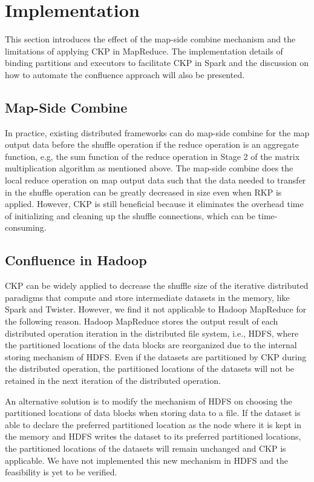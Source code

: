 \documentclass[10pt,journal,compsoc]{IEEEtran}
\begin{document}
\section{Implementation}\label{section:implement}
This section introduces the effect of the map-side combine mechanism and the
limitations of applying CKP in MapReduce.
The implementation details of binding partitions and executors to
facilitate CKP in Spark and the discussion on how to automate
the confluence approach will also be presented.

\subsection{Map-Side Combine}
In practice, existing distributed frameworks can do map-side
combine for the map output data before the shuffle operation if the
reduce operation is an aggregate function, e.g, the sum function of the
reduce operation in Stage 2 of the matrix multiplication algorithm as
mentioned above.
The map-side combine does the local reduce operation on map output data
such that the data needed to transfer in the shuffle operation can be
greatly decreased in size even when RKP is applied.
However, CKP is still beneficial because it eliminates the overhead time
of initializing and cleaning up the %
shuffle connections, which can be time-consuming.


\subsection{Confluence in Hadoop}
CKP can be widely applied to decrease the shuffle size of the iterative
distributed paradigms that compute and store intermediate datasets in
the memory, like Spark and Twister.
However, we find it not applicable to Hadoop MapReduce for the following reason. 
Hadoop MapReduce stores the output result of each distributed operation
iteration in the distributed file system, i.e., HDFS,
where the partitioned locations of the data blocks are reorganized due to the internal storing mechanism of HDFS.
Even if the datasets are partitioned by CKP during the distributed
operation, the partitioned locations of the datasets will not be
retained in the next iteration of the distributed operation.

An alternative solution is to modify the mechanism of HDFS on choosing the
partitioned locations of data blocks when storing data to a file.
If the dataset is able to declare the preferred partitioned location as the node where it is kept in the memory and HDFS writes the dataset to its preferred partitioned locations, the partitioned locations of the datasets will remain unchanged and CKP is applicable. 
We have not implemented this new mechanism in HDFS and the feasibility is yet to be verified. 
\end{document}
